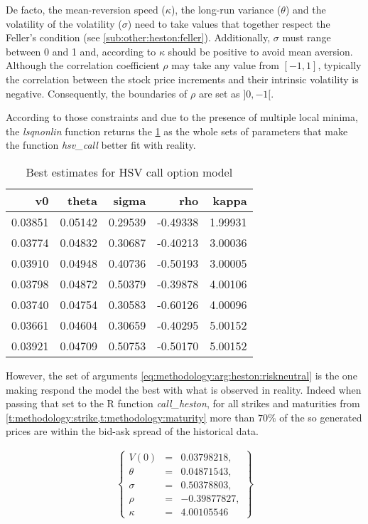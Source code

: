 \documentclass[12pt]{report}
\begin{document}
De facto, the mean-reversion speed ($\kappa$), the long-run variance ($\theta$) and the volatility of the volatility ($\sigma$) need to take values that together respect the Feller's condition (see \cref{sub:other:heston:feller}). 
Additionally, $\sigma$ must range between 0 and 1 and, according to \citet{cristo2015} $\kappa$ should be positive to avoid mean aversion.
Although the correlation coefficient $\rho$ may take any value from $[-1, 1]$, typically the correlation between the stock price increments and their intrinsic volatility is negative. Consequently, the boundaries of $\rho$ are set as $]0, -1[$.

According to those constraints and due to the presence of multiple local minima, the \textit{lsqnonlin} function returns the \cref{t:methodology:call:heston:estimate1} as the whole sets of parameters that make the function \textit{hsv\_call} better fit with reality.

\begin{table}[h]
\centering
\begin{tabular}{rrrrr}
  \hline
v0 & theta & sigma & rho & kappa \\ 
  \hline
  0.03851 & 0.05142 & 0.29539 & -0.49338 & 1.99931 \\ 
  0.03774 & 0.04832 & 0.30687 & -0.40213 & 3.00036 \\ 
  0.03910 & 0.04948 & 0.40736 & -0.50193 & 3.00005 \\ 
  0.03798 & 0.04872 & 0.50379 & -0.39878 & 4.00106 \\
  0.03740 & 0.04754 & 0.30583 & -0.60126 & 4.00096 \\ 
  0.03661 & 0.04604 & 0.30659 & -0.40295 & 5.00152 \\ 
  0.03921 & 0.04709 & 0.50753 & -0.50170 & 5.00152 \\ 
   \hline
\end{tabular}
\caption{Best estimates for HSV call option model} 
\label{t:methodology:call:heston:estimate1}
\end{table}

However, the set of arguments \ref{eq:methodology:arg:heston:riskneutral} is the one making respond the model the best with what is observed in reality.
Indeed when passing that set to the R function \textit{call\_heston}, for all strikes and maturities from \cref{t:methodology:strike,t:methodology:maturity}  more than $70\%$ of the so generated prices are within the bid-ask spread of the historical data.

\begin{align}
  \left \{
  \begin{array}{lcl}
    V(0) &= &0.03798218, \\
    \theta &= &0.04871543, \\
    \sigma &= &0.50378803, \\
    \rho &= &-0.39877827, \\
    \kappa &= &4.00105546 
  \end{array}
  \right \}  
  \label{eq:methodology:arg:heston:riskneutral}
\end{align}
\end{document}
